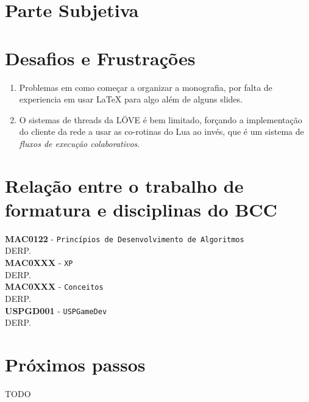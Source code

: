 \chapter*{Parte Subjetiva}
\label{sec:parte_subjetiva}

\chapter{Desafios e Frustrações}
\label{sec:desafios_frustracoes}

    \begin{enumerate}
        \item Problemas em como começar a organizar a monografia, por falta de experiencia em
            usar LaTeX para algo além de alguns slides.
            
        \item O sistemas de threads da LÖVE é bem limitado, forçando a implementação do cliente da rede a usar
            as co-rotinas do Lua ao invés, que é um sistema de \textit{fluxos de execução colaborativos}.
    \end{enumerate}

\chapter{Relação entre o trabalho de formatura e disciplinas do BCC}
\label{sec:relacao_disciplinas_bcc}
\newcommand\materia[3]{\noindent \textbf{#1} - \texttt{#2}\\\indent #3\vspace{0.5cm}\\}

\materia{MAC0122}{Princípios de Desenvolvimento de Algoritmos}{
    DERP.
}
\materia{MAC0XXX}{XP}{
    DERP.
}
\materia{MAC0XXX}{Conceitos}{
    DERP.
}

\materia{USPGD001}{USPGameDev}{
    DERP.
}

\chapter{Próximos passos}
\label{sec:proximos_passos}

TODO
